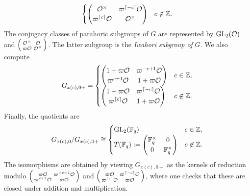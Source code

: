 \begin{example}
$$\begin{cases}
        \begin{pmatrix}
            \mathcal{O}^\times & \varpi^{\lceil -c\rceil}\mathcal{O} \\ \varpi^{\lceil c\rceil} \mathcal{O} & \mathcal{O}^\times
        \end{pmatrix}  & c \not\in \mathbb{Z}.
    \end{cases}
    $$
    The conjugacy classes of parahoric subgroups of $G$ are represented by $\mathrm{GL}_2(\mathcal{O})$ and $\begin{psmallmatrix}
        \mathcal{O}^\times & \mathcal{O} \\ \varpi\mathcal{O} & \mathcal{O}^\times
    \end{psmallmatrix}$. The latter subgroup is the \textit{Iwahori subgroup of} $G$. We also compute 
    $$
    G_{x(c),0+} = 
    \begin{cases}  
        \begin{pmatrix}
            1+\varpi\mathcal{O} & \varpi^{-c+1}\mathcal{O} \\ \varpi^{c+1} \mathcal{O} & 1+\varpi\mathcal{O}
        \end{pmatrix} & c \in \mathbb{Z}, \\
        \begin{pmatrix}
            1+\varpi\mathcal{O} & \varpi^{\lceil -c\rceil}\mathcal{O} \\ \varpi^{\lceil c\rceil} \mathcal{O} & 1+\varpi\mathcal{O}
        \end{pmatrix}  & c \not\in \mathbb{Z}.
    \end{cases}
    $$
    Finally, the quotients are 
    $$
    G_{x(c),0}/G_{x(c),0+} \cong 
    \begin{cases}  
        \mathrm{GL}_2(\mathbb{F}_q) & c \in \mathbb{Z}, \\
        T(\mathbb{F}_q) := \begin{pmatrix}
            \mathbb{F}_q^\times & 0 \\ 0 & \mathbb{F}_q^\times
        \end{pmatrix}  & c \not\in \mathbb{Z}.
    \end{cases}
    $$
    The isomorphisms are obtained by viewing $G_{x(c),0+}$ as the kernels of reduction modulo $\begin{psmallmatrix}
        \varpi\mathcal{O} & \varpi^{-c+1}\mathcal{O} \\ \varpi^{c+1}\mathcal{O} & \varpi \mathcal{O}
    \end{psmallmatrix}$ and $\begin{psmallmatrix}
        \varpi\mathcal{O} & \varpi^{\lceil -c\rceil}\mathcal{O} \\ \varpi^{\lceil c\rceil} \mathcal{O} & \varpi\mathcal{O}
    \end{psmallmatrix}$, where one checks that these are closed under addition and multiplication.   
\end{example}

